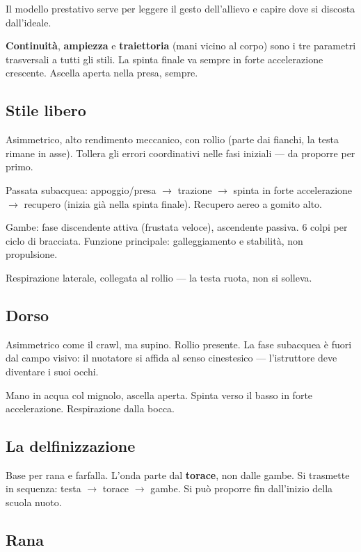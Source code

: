 \documentclass[12pt, a4paper]{article}
\begin{document}
Il modello prestativo serve per leggere il gesto dell'allievo e capire dove si discosta dall'ideale.

\textbf{Continuità}, \textbf{ampiezza} e \textbf{traiettoria} (mani vicino al corpo) sono i tre parametri trasversali a tutti gli stili. La spinta finale va sempre in forte accelerazione crescente. Ascella aperta nella presa, sempre.

\subsection{Stile libero}

Asimmetrico, alto rendimento meccanico, con rollio (parte dai fianchi, la testa rimane in asse). Tollera gli errori coordinativi nelle fasi iniziali --- da proporre per primo.

Passata subacquea: appoggio/presa $\rightarrow$ trazione $\rightarrow$ spinta in forte accelerazione $\rightarrow$ recupero (inizia già nella spinta finale). Recupero aereo a gomito alto.

Gambe: fase discendente attiva (frustata veloce), ascendente passiva. 6 colpi per ciclo di bracciata. Funzione principale: galleggiamento e stabilità, non propulsione.

Respirazione laterale, collegata al rollio --- la testa ruota, non si solleva.

\subsection{Dorso}

Asimmetrico come il crawl, ma supino. Rollio presente. La fase subacquea è fuori dal campo visivo: il nuotatore si affida al senso cinestesico --- l'istruttore deve diventare i suoi occhi.

Mano in acqua col mignolo, ascella aperta. Spinta verso il basso in forte accelerazione. Respirazione dalla bocca.

\subsection{La delfinizzazione}

Base per rana e farfalla. L'onda parte dal \textbf{torace}, non dalle gambe. Si trasmette in sequenza: testa $\rightarrow$ torace $\rightarrow$ gambe. Si può proporre fin dall'inizio della scuola nuoto.

\subsection{Rana}
\end{document}

